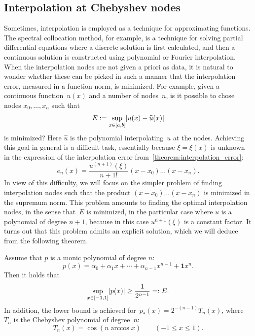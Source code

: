 \subsection{Interpolation at Chebyshev nodes}
Sometimes,
interpolation is employed as a technique for approximating functions.
The spectral collocation method, for example,
is a technique for solving partial differential equations
where a discrete solution is first calculated,
and then a continuous solution is constructed using polynomial or Fourier interpolation.
When the interpolation nodes are not given a priori as data,
it is natural to wonder whether these can be picked in such a manner that the interpolation error,
measured in a function norm, is minimized.
For example, given a continuous function~$u(x)$ and a number of nodes~$n$,
is it possible to chose nodes $x_0, \dotsc, x_n$ such that
\[
    E := \sup_{x \in [a, b]} \lvert u(x) - \widehat u(x)\rvert
\]
is minimized?
Here $\widehat u$ is the polynomial interpolating~$u$ at the nodes.
Achieving this goal in general is a difficult task,
essentially because $\xi = \xi(x)$ is unknown in the expression of the interpolation error from~\cref{theorem:interpolation_error}:
\[
    e_n(x) = \frac{u^{(n+1)}(\xi)}{n+1!} (x-x_0) \dotsc (x - x_n).
\]
In view of this difficulty,
we will focus on the simpler problem of finding interpolation nodes
such that the product $(x-x_0) \dotsc (x - x_n)$ is minimized in the supremum norm.
This problem amounts to finding the optimal interpolation nodes,
in the sense that~$E$ is minimized,
in the particular case where $u$ is a polynomial of degree $n+1$,
because in this case $u^{n+1}(\xi)$ is a constant factor.
It turns out that this problem admits an explicit solution,
which we will deduce from the following theorem.
\begin{theorem}
    \label{theorem:minimum_infty_norm}
    Assume that $p$ is a monic polynomial of degree $n$:
    \[
        p(x) = \alpha_0 + \alpha_1 x + \dotsb + \alpha_{n-1} x^{n-1} + \mathbf{1} x^n.
    \]
    Then it holds that
    \begin{equation}
        \label{eq:chebychev_lower_bound}
        \sup_{x \in [-1, 1]} \lvert p(x)\rvert \geq \frac{1}{2^{n-1}} =: E.
    \end{equation}
    In addition, the lower bound is achieved for~$p_*(x) = 2^{-(n-1)} T_n(x)$,
    where $T_n$ is the Chebyshev polynomial of degree~$n$:
    \begin{equation}
        \label{eq:chebyshev_polynomial}
        T_n(x) = \cos(n\arccos x) \qquad (-1 \leq x \leq 1).
    \end{equation}
\end{theorem}

